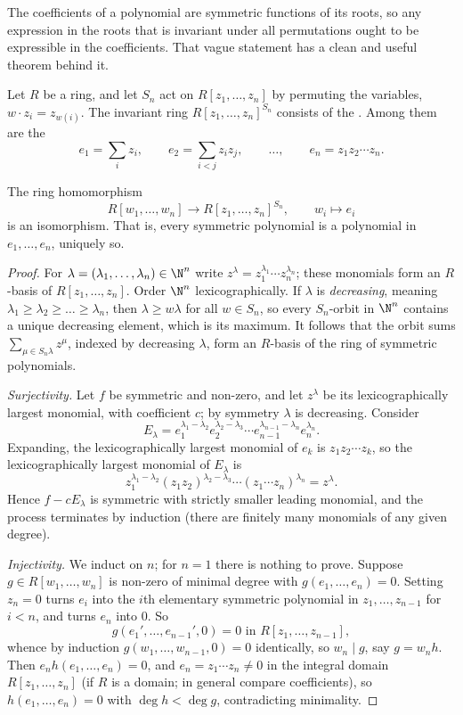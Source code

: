 The coefficients of a polynomial are symmetric functions of its roots, so any expression in the roots that is invariant under all permutations ought to be expressible in the coefficients. That vague statement has a clean and useful theorem behind it.

Let $R$ be a ring, and let $S_n$ act on $R[z_1,\dots,z_n]$ by permuting the variables, $w \cdot z_i = z_{w(i)}$. The invariant ring $R[z_1,\dots,z_n]^{S_n}$ consists of the . Among them are the 
$$e_1 = \sum_i z_i, \qquad e_2 = \sum_{i<j}z_iz_j, \qquad \dots, \qquad e_n = z_1z_2\cdots z_n.$$

\begin{theorem}\label{thm:symm}
	The ring homomorphism
	$$R[w_1,\dots,w_n] \to R[z_1,\dots,z_n]^{S_n}, \qquad w_i \mapsto e_i$$
	is an isomorphism. That is, every symmetric polynomial is a polynomial in $e_1,\dots,e_n$, uniquely so.
\end{theorem}

\begin{proof}
	For $\lambda = (\lambda_1,\dots,\lambda_n) \in \N^n$ write $z^\lambda = z_1^{\lambda_1}\cdots z_n^{\lambda_n}$; these monomials form an $R$-basis of $R[z_1,\dots,z_n]$. Order $\N^n$ lexicographically. If $\lambda$ is \emph{decreasing}, meaning $\lambda_1 \geq \lambda_2 \geq \dots \geq \lambda_n$, then $\lambda \geq w\lambda$ for all $w \in S_n$, so every $S_n$-orbit in $\N^n$ contains a unique decreasing element, which is its maximum. It follows that the orbit sums $\sum_{\mu \in S_n\lambda} z^\mu$, indexed by decreasing $\lambda$, form an $R$-basis of the ring of symmetric polynomials.

	\emph{Surjectivity.} Let $f$ be symmetric and non-zero, and let $z^\lambda$ be its lexicographically largest monomial, with coefficient $c$; by symmetry $\lambda$ is decreasing. Consider
	$$E_\lambda = e_1^{\lambda_1-\lambda_2}e_2^{\lambda_2-\lambda_3}\cdots e_{n-1}^{\lambda_{n-1}-\lambda_n}e_n^{\lambda_n}.$$
	Expanding, the lexicographically largest monomial of $e_k$ is $z_1z_2\cdots z_k$, so the lexicographically largest monomial of $E_\lambda$ is
	$$z_1^{\lambda_1-\lambda_2}(z_1z_2)^{\lambda_2-\lambda_3}\cdots(z_1\cdots z_n)^{\lambda_n} = z^\lambda.$$
	Hence $f - cE_\lambda$ is symmetric with strictly smaller leading monomial, and the process terminates by induction (there are finitely many monomials of any given degree).

	\emph{Injectivity.} We induct on $n$; for $n=1$ there is nothing to prove. Suppose $g \in R[w_1,\dots,w_n]$ is non-zero of minimal degree with $g(e_1,\dots,e_n) = 0$. Setting $z_n = 0$ turns $e_i$ into the $i$th elementary symmetric polynomial in $z_1,\dots,z_{n-1}$ for $i < n$, and turns $e_n$ into $0$. So
	$$g(e_1', \dots, e_{n-1}', 0) = 0 \text{ in } R[z_1,\dots,z_{n-1}],$$
	whence by induction $g(w_1,\dots,w_{n-1},0) = 0$ identically, so $w_n \mid g$, say $g = w_n h$. Then $e_n h(e_1,\dots,e_n) = 0$, and $e_n = z_1\cdots z_n \neq 0$ in the integral domain $R[z_1,\dots,z_n]$ (if $R$ is a domain; in general compare coefficients), so $h(e_1,\dots,e_n) = 0$ with $\deg h < \deg g$, contradicting minimality.
\end{proof}

